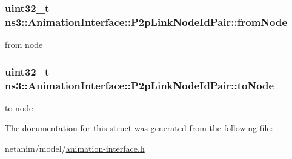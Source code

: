 \subsubsection[{\texorpdfstring{from\+Node}{fromNode}}]{\setlength{\rightskip}{0pt plus 5cm}uint32\+\_\+t ns3\+::\+Animation\+Interface\+::\+P2p\+Link\+Node\+Id\+Pair\+::from\+Node}\hypertarget{structns3_1_1AnimationInterface_1_1P2pLinkNodeIdPair_af0a05bb0c884bb5cab25da804af4dc33}{}\label{structns3_1_1AnimationInterface_1_1P2pLinkNodeIdPair_af0a05bb0c884bb5cab25da804af4dc33}


from node 

\subsubsection[{\texorpdfstring{to\+Node}{toNode}}]{\setlength{\rightskip}{0pt plus 5cm}uint32\+\_\+t ns3\+::\+Animation\+Interface\+::\+P2p\+Link\+Node\+Id\+Pair\+::to\+Node}\hypertarget{structns3_1_1AnimationInterface_1_1P2pLinkNodeIdPair_abe203e56cfe85b60432c89fa20ec8945}{}\label{structns3_1_1AnimationInterface_1_1P2pLinkNodeIdPair_abe203e56cfe85b60432c89fa20ec8945}


to node 



The documentation for this struct was generated from the following file\+:\begin{DoxyCompactItemize}
\item 
netanim/model/\hyperlink{animation-interface_8h}{animation-\/interface.\+h}\end{DoxyCompactItemize}
